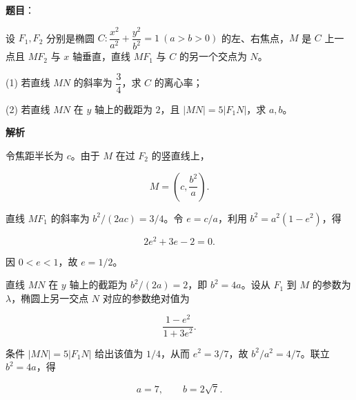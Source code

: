 \begin{answer}

\textbf{题目}：

设 $F_1,F_2$ 分别是椭圆 $C:\dfrac{x^2}{a^2}+\dfrac{y^2}{b^2}=1\ (a>b>0)$ 的左、右焦点，$M$ 是 $C$ 上一点且 $MF_2$ 与 $x$ 轴垂直，直线 $MF_1$ 与 $C$ 的另一个交点为 $N$。

(1) 若直线 $MN$ 的斜率为 $\dfrac34$，求 $C$ 的离心率；

(2) 若直线 $MN$ 在 $y$ 轴上的截距为 $2$，且 $|MN|=5|F_1N|$，求 $a,b$。

\textbf{解析}

令焦距半长为 $c$。由于 $M$ 在过 $F_2$ 的竖直线上，

\nopagebreak[4]
\[
M=\left(c,\frac{b^2}{a}\right).
\]


直线 $MF_1$ 的斜率为 $b^2/(2ac)=3/4$。令 $e=c/a$，利用 $b^2=a^2(1-e^2)$，得

\nopagebreak[4]
\[
2e^2+3e-2=0.
\]

因 $0<e<1$，故 $e=1/2$。


直线 $MN$ 在 $y$ 轴上的截距为 $b^2/(2a)=2$，即 $b^2=4a$。设从 $F_1$ 到 $M$ 的参数为 $\lambda$，椭圆上另一交点 $N$ 对应的参数绝对值为

\nopagebreak[4]
\[
\frac{1-e^2}{1+3e^2}.
\]

条件 $|MN|=5|F_1N|$ 给出该值为 $1/4$，从而 $e^2=3/7$，故 $b^2/a^2=4/7$。联立 $b^2=4a$，得

\nopagebreak[4]
\[
a=7,\qquad b=2\sqrt7.
\]



\end{answer}
